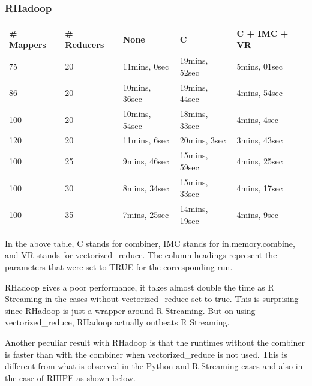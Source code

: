 \documentclass[
journal=jacsat, %
manuscript=article]{achemso}
\begin{document}
\subsubsection{RHadoop}
\begin{table}[H]
\begin{tabular}{ l | l | l | l | l }
\# Mappers & \# Reducers & None & C & C + IMC + VR \\ \hline
 75 & 20 & 11mins, 0sec & 19mins, 52sec & 5mins, 01sec \\\hline
 86 & 20 & 10mins, 36sec & 19mins, 44sec & 4mins, 54sec \\\hline
 100 & 20 & 10mins, 54sec & 18mins, 33sec & 4mins, 4sec \\\hline
 120 & 20 & 11mins, 6sec & 20mins, 3sec & 3mins, 43sec \\\hline
 100 & 25 & 9mins, 46sec & 15mins, 59sec & 4mins, 25sec \\\hline
 100 & 30 & 8mins, 34sec & 15mins, 33sec & 4mins, 17sec \\\hline
 100 & 35 & 7mins, 25sec & 14mins, 19sec & 4mins, 9sec \\
\end{tabular}
\end{table}
In the above table, C stands for combiner, IMC stands for in.memory.combine, and VR stands for vectorized\_reduce. The column headings represent the parameters that were set to TRUE for the corresponding run. 

RHadoop gives a poor performance, it takes almost double the time as R Streaming in the cases without vectorized\_reduce set to true. This is surprising since RHadoop is just a wrapper around R Streaming. But on using vectorized\_reduce, RHadoop actually outbeats R Streaming. 

Another peculiar result with RHadoop is that the runtimes without the combiner is faster than with the combiner when vectorized\_reduce is not used. This is different from what is observed in the Python and R Streaming cases and also in the case of RHIPE as shown below. 
\end{document}
